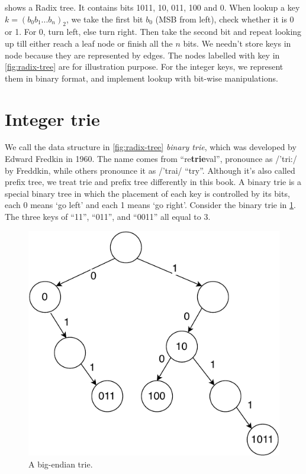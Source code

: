 \documentclass[b5paper]{article}
\begin{document}
 shows a Radix tree. It contains bits 1011, 10, 011, 100 and 0. When lookup a key $k=(b_0b_1...b_n)_2$, we take the first bit $b_0$ (MSB from left), check whether it is 0 or 1. For 0, turn left, else turn right. Then take the second bit and repeat looking up till either reach a leaf node or finish all the $n$ bits. We needn't store keys in node because they are represented by edges. The nodes labelled with key in \cref{fig:radix-tree} are for illustration purpose. For the integer keys, we represent them in binary format, and implement lookup with bit-wise manipulations.

\section{Integer trie}
\label{int-trie} 

We call the data structure in \cref{fig:radix-tree} \emph{binary trie}, which was developed by Edward Fredkin in 1960. The name comes from ``re\textbf{trie}val'', pronounce as /'tri:/ by Freddkin, while others pronounce it as /'trai/ ``try''\cite{wiki-trie}. Although it's also called prefix tree, we treat trie and prefix tree differently in this book. A binary trie is a special binary tree in which the placement of each key is controlled by its bits, each 0 means `go left' and each 1 means `go right'\cite{okasaki-int-map}. Consider the binary trie in \cref{fig:big-endian-trie}. The three keys of ``11'', ``011'', and ``0011'' all equal to 3.

\begin{figure}[htbp]
  \centering
  \includegraphics[scale=0.6, page=2]{img/trie}
  \caption{A big-endian trie.}
  \label{fig:big-endian-trie}
\end{figure}
\end{document}
